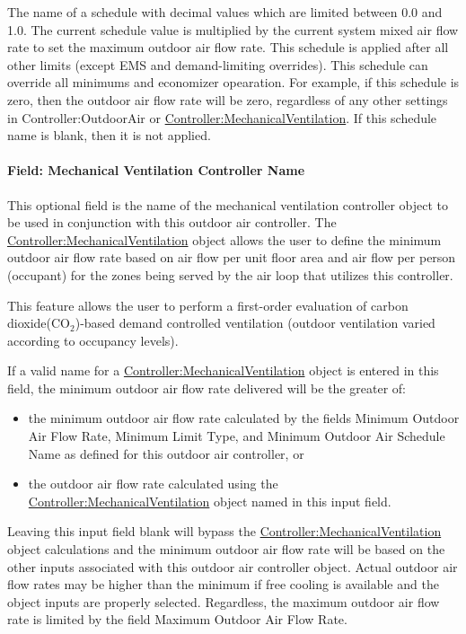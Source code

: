 The name of a schedule with decimal values which are limited between 0.0 and 1.0. The current schedule value is multiplied by the current system mixed air flow rate to set the maximum outdoor air flow rate. This schedule is applied after all other limits (except EMS and demand-limiting overrides).  This schedule can override all minimums and economizer opearation.  For example, if this schedule is zero, then the outdoor air flow rate will be zero, regardless of any other settings in Controller:OutdoorAir or \hyperref[controllermechanicalventilation]{Controller:MechanicalVentilation}. If this schedule name is blank, then it is not applied.

\paragraph{Field: Mechanical Ventilation Controller Name}\label{field-mechanical-ventilation-controller-name}

This optional field is the name of the mechanical ventilation controller object to be used in conjunction with this outdoor air controller. The \hyperref[controllermechanicalventilation]{Controller:MechanicalVentilation} object allows the user to define the minimum outdoor air flow rate based on air flow per unit floor area and air flow per person (occupant) for the zones being served by the air loop that utilizes this controller.

This feature allows the user to perform a first-order evaluation of carbon dioxide(CO\(_{2}\))-based demand controlled ventilation (outdoor ventilation varied according to occupancy levels).

If a valid name for a \hyperref[controllermechanicalventilation]{Controller:MechanicalVentilation} object is entered in this field, the minimum outdoor air flow rate delivered will be the greater of:

\begin{itemize}
\item
  the minimum outdoor air flow rate calculated by the fields Minimum Outdoor Air Flow Rate, Minimum Limit Type, and Minimum Outdoor Air Schedule Name as defined for this outdoor air controller, or
\item
  the outdoor air flow rate calculated using the \hyperref[controllermechanicalventilation]{Controller:MechanicalVentilation} object named in this input field.
\end{itemize}

Leaving this input field blank will bypass the \hyperref[controllermechanicalventilation]{Controller:MechanicalVentilation} object calculations and the minimum outdoor air flow rate will be based on the other inputs associated with this outdoor air controller object. Actual outdoor air flow rates may be higher than the minimum if free cooling is available and the object inputs are properly selected. Regardless, the maximum outdoor air flow rate is limited by the field Maximum Outdoor Air Flow Rate.

